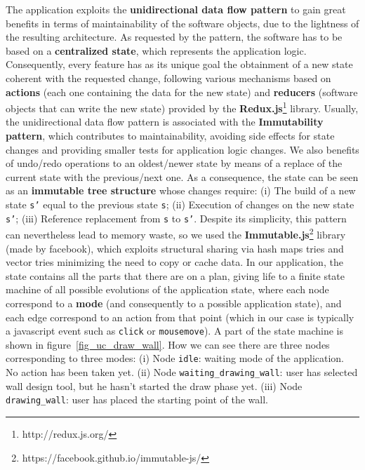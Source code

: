 The application exploits the \textbf{unidirectional data flow pattern} to gain great benefits in terms of maintainability of the software objects, due to the lightness of the resulting architecture. As requested by the pattern, the software has to be based on a \textbf{centralized state}, which represents the application logic. Consequently, every feature has as its unique goal the obtainment of a new state coherent with the requested change, following various mechanisms based on \textbf{actions} (each one containing the data for the new state) and \textbf{reducers} (software objects that can write the new state) provided by the \textbf{Redux.js}\footnote{http://redux.js.org/} library. Usually, the unidirectional data flow pattern is associated with the \textbf{Immutability pattern}, which contributes to maintainability, avoiding side effects for state changes and providing smaller tests for application logic changes. We also benefits of undo/redo operations to an oldest/newer state by means of a replace of the current state with the previous/next one. As a consequence, the state can be seen as an \textbf{immutable tree structure} whose changes require: (i) The build of a new state \texttt{s'} equal to the previous state \texttt{s}; (ii) Execution of changes on the new state \texttt{s'}; (iii) Reference replacement from \texttt{s} to \texttt{s'}. Despite its simplicity, this pattern can nevertheless lead to memory waste, so we used the \textbf{Immutable.js}\footnote{https://facebook.github.io/immutable-js/} library (made by facebook), which exploits structural sharing via hash maps tries and vector tries minimizing the need to copy or cache data.
In our application, the state contains all the parts that there are on a plan, giving life to a finite state machine of all possible evolutions of the application state, where each node correspond to a \textbf{mode} (and consequently to a possible application state), and each edge correspond to an action from that point (which in our case is typically a javascript event such as \texttt{click} or \texttt{mousemove}). A part of the state machine is shown in figure~\ref{fig_uc_draw_wall}. How we can see there are three nodes corresponding to three modes: (i) Node \texttt{idle}: waiting mode of the application. No action has been taken yet. (ii) Node \texttt{waiting\_drawing\_wall}: user has selected wall design tool, but he hasn't started the draw phase yet. (iii) Node \texttt{drawing\_wall}: user has placed the starting point of the wall.

